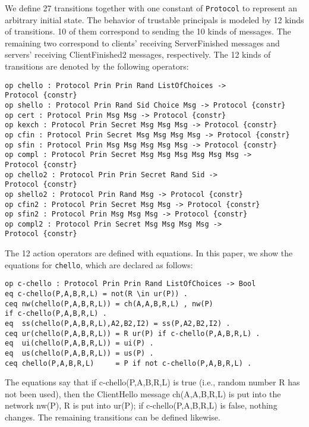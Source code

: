 \documentclass[a4paper,fleqn]{cas-dc}
\begin{document}
We define 27 transitions together with one constant of \verb!Protocol! to represent an arbitrary initial state.
The behavior of trustable principals is modeled by 12
kinds of transitions. 10 of them correspond to sending
the 10 kinds of messages. The remaining two correspond
to clients’ receiving ServerFinished messages and
servers’ receiving ClientFinished2 messages, respectively.
The 12 kinds of transitions are denoted by the following operators:
\begin{small}
\begin{verbatim}
op chello : Protocol Prin Prin Rand ListOfChoices ->
Protocol {constr}
op shello : Protocol Prin Rand Sid Choice Msg -> Protocol {constr}
op cert : Protocol Prin Msg Msg -> Protocol {constr}
op kexch : Protocol Prin Secret Msg Msg Msg -> Protocol {constr}
op cfin : Protocol Prin Secret Msg Msg Msg Msg -> Protocol {constr}
op sfin : Protocol Prin Msg Msg Msg Msg Msg -> Protocol {constr}
op compl : Protocol Prin Secret Msg Msg Msg Msg Msg Msg ->
Protocol {constr}
op chello2 : Protocol Prin Prin Secret Rand Sid -> 
Protocol {constr}
op shello2 : Protocol Prin Rand Msg -> Protocol {constr}
op cfin2 : Protocol Prin Secret Msg Msg -> Protocol {constr}
op sfin2 : Protocol Prin Msg Msg Msg -> Protocol {constr}
op compl2 : Protocol Prin Secret Msg Msg Msg Msg -> 
Protocol {constr} 
\end{verbatim}
\end{small}	

The 12 action operators are defined with equations. In
this paper, we show the equations for \verb!chello!, which are declared as follows:
\begin{small}
\begin{verbatim}
op c-chello : Protocol Prin Prin Rand ListOfChoices -> Bool
eq c-chello(P,A,B,R,L) = not(R \in ur(P)) .
ceq nw(chello(P,A,B,R,L)) = ch(A,A,B,R,L) , nw(P) 
if c-chello(P,A,B,R,L) .
eq  ss(chello(P,A,B,R,L),A2,B2,I2) = ss(P,A2,B2,I2) .
ceq ur(chello(P,A,B,R,L)) = R ur(P) if c-chello(P,A,B,R,L) .
eq  ui(chello(P,A,B,R,L)) = ui(P) .
eq  us(chello(P,A,B,R,L)) = us(P) .
ceq chello(P,A,B,R,L)     = P if not c-chello(P,A,B,R,L) . 
\end{verbatim}
\end{small}	
The  equations  say  that  if c-chello(P,A,B,R,L) is  true
(i.e., random number R has   not   been   used), then the ClientHello message ch(A,A,B,R,L) is put into the network nw(P), R is put into ur(P); if c-chello(P,A,B,R,L) is  false,  nothing  changes.  The remaining transitions can be defined likewise.
\end{document}
